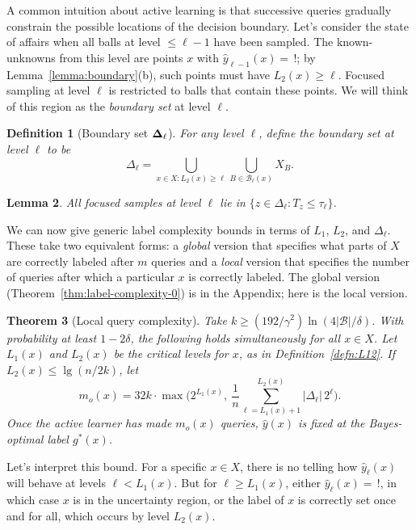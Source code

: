 \documentclass[twoside]{article}
\def\B{{\mathcal B}}
\def\yh{{\widehat{y}}}
\newtheorem{thm}{Theorem}
\newtheorem{lemma}[thm]{Lemma}
\newtheorem{defn}[thm]{Definition}
\begin{document}
A common intuition about active learning is that successive queries gradually constrain the possible locations of the decision boundary. Let's consider the state of affairs when all balls at level $\leq \ell - 1$ have been sampled. The known-unknowns from this level are points $x$ with $\yh_{\ell-1}(x) = \, !$; by Lemma~\ref{lemma:boundary}(b), such points must have $L_2(x) \geq \ell$. Focused sampling at level $\ell$ is restricted to balls that contain these points. We will think of this region as the \emph{boundary set} at level $\ell$.
\begin{defn}[Boundary set $\bf \Delta_\ell$]
For any level $\ell$, define the \emph{boundary set} at level $\ell$ to be
\begin{equation}
\Delta_\ell 
= \bigcup_{x \in X: L_2(x) \geq \ell} \bigcup_{B \in \B_{\ell}(x)} X_B 
.
\label{eq:sampling-region}
\end{equation}
\end{defn}
\begin{lemma}
All focused samples at level $\ell$ lie in $\{z \in \Delta_\ell: T_z \leq \tau_\ell \}$.
\label{lemma:focused}
\end{lemma}

We can now give generic label complexity bounds in terms of $L_1$, $L_2$, and $\Delta_\ell$. These take two equivalent forms: a \emph{global} version that specifies what parts of $X$ are correctly labeled after $m$ queries and a \emph{local} version that specifies the number of queries after which a particular $x$ is correctly labeled. The global version (Theorem~\ref{thm:label-complexity-0}) is in the Appendix; here is the local version.

\begin{thm}[Local query complexity]
Take $k \geq (192/\gamma^2) \ln (4 |\B|/\delta)$. With probability at least $1-2\delta$, the following holds simultaneously for all $x \in X$. Let $L_1(x)$ and $L_2(x)$ be the critical levels for $x$, as in Definition~\ref{defn:L12}. If $L_2(x) \leq \lg (n/2k)$, let
\[
m_o(x) = 32k \cdot \max\bigg( 2^{L_1(x)}, \ \frac{1}{n} \sum_{\ell=L_1(x)+1}^{L_2(x)} |\Delta_\ell| \, 2^\ell\bigg) .
\]
Once the active learner has made $m_o(x)$ queries, $\yh(x)$ is fixed at the Bayes-optimal label $g^*(x)$.
\label{thm:label-complexity}
\end{thm}
Let's interpret this bound. For a specific $x \in X$, there is no telling how $\yh_\ell(x)$ will behave at levels $\ell < L_1(x)$. But for $\ell \geq L_1(x)$, either $\yh_\ell(x) = \, !$, in which case $x$ is in the uncertainty region, or the label of $x$ is correctly set once and for all, which occurs by level $L_2(x)$. 
\end{document}

